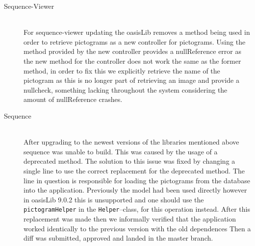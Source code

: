 \begin{description}
    \item[Sequence-Viewer] \hfill \\
    For sequence-viewer updating the oasisLib removes a method being used in order to retrieve pictograms as a new controller for pictograms.
    Using the method provided by the new controller provides a nullReference error as the new method for the controller does not work the same as the former method, in order to fix this we explicitly retrieve the name of the pictogram as this is no longer part of retrieving an image and provide a nullcheck, something lacking throughout the system considering the amount of nullReference crashes.
    \item[Sequence] \hfill \\
    After upgrading to the newest versions of the libraries mentioned above sequence was unable to build. 
    This was caused by the usage of a deprecated method. 
    The solution to this issue was fixed by changing a single line to use the correct replacement for the deprecated method.
    The line in question is responsible for loading the pictograms from the database into the application. 
    Previously the model had been used directly however in oasisLib 9.0.2 this is unsupported and one should use the \texttt{pictogramHelper} in the \texttt{Helper}--class, for this operation instead.
    After this replacement was made then we informally verified that the application worked identically to the previous version with the old dependences
    Then a diff was submitted, approved and landed in the master branch. 
\end{description}

